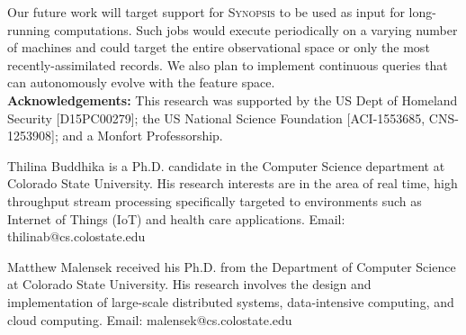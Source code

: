 \documentclass[9pt,journal,compsoc]{IEEEtran}
\begin{document}
Our future work will target support for \textsc{Synopsis} to be used as input for long-running computations. Such jobs would execute periodically on a varying number of machines and could target the entire observational space or only the most recently-assimilated records. We also plan to implement continuous queries that can autonomously evolve with the feature space.
\vspace{1em}\\
%
%
\textbf{Acknowledgements:}
This research was supported by the US Dept of Homeland Security [D15PC00279]; the US National Science Foundation [ACI-1553685, CNS-1253908]; and a Monfort Professorship.



\vspace*{-3.7\baselineskip}
\begin{IEEEbiography}{Thilina Buddhika} is a Ph.D. candidate in the Computer Science department at Colorado State University.  His research interests are in the area of real time, high throughput stream processing specifically targeted to environments such as Internet of Things (IoT) and health care applications. Email: thilinab@cs.colostate.edu
\end{IEEEbiography}
\vspace{-1.60cm}
\begin{IEEEbiography}{Matthew Malensek} received his Ph.D. from the Department of Computer Science at Colorado State University. His research involves the design and implementation of large-scale distributed systems, data-intensive computing, and cloud computing. Email: malensek@cs.colostate.edu
\end{IEEEbiography}
\end{document}
